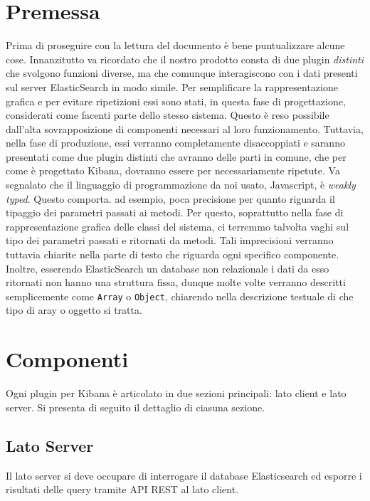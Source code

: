 
\section{Premessa}
Prima di proseguire con la lettura del documento è bene puntualizzare alcune cose.
Innanzitutto va ricordato che il nostro prodotto consta di due plugin \emph{distinti} che svolgono funzioni diverse, ma che comunque interagiscono con i dati presenti sul server ElasticSearch in modo simile. Per semplificare la rappresentazione grafica e per evitare ripetizioni essi sono stati, in questa fase di progettazione, considerati come facenti parte dello stesso sistema. Questo è reso possibile dall'alta sovrapposizione di componenti necessari al loro funzionamento. Tuttavia, nella fase di produzione, essi verranno completamente disaccoppiati e saranno presentati come due plugin distinti che avranno delle parti in comune, che per come è progettato Kibana, dovranno essere per necessariamente ripetute. Va segnalato che il linguaggio di programmazione da noi usato, Javascript, è \emph{weakly typed}. Questo comporta. ad esempio, poca precisione per quanto riguarda il tipaggio dei parametri passati ai metodi. Per questo, soprattutto nella fase di rappresentazione grafica delle classi del sistema, ci terremmo talvolta vaghi sul tipo dei parametri passati e ritornati da metodi. Tali imprecisioni verranno tuttavia chiarite nella parte di testo che riguarda ogni specifico componente. Inoltre, esserendo ElasticSearch un database non relazionale i dati da esso ritornati non hanno una struttura fissa, dunque molte volte verranno descritti semplicemente come \texttt{Array} o \texttt{Object}, chiarendo nella descrizione testuale di che tipo di aray o oggetto si tratta.

\section{Componenti}

Ogni plugin per Kibana è articolato in due sezioni principali: lato client e lato server. Si presenta di seguito il dettaglio di ciasuna sezione.

\subsection{Lato Server}
Il lato server si deve occupare di interrogare il database Elasticsearch ed esporre i risultati delle query tramite API REST al lato client.

